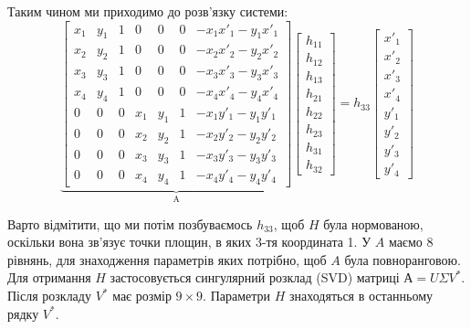 Таким чином ми приходимо до розв'язку системи:
\begin{equation}
    \underbrace{
        \begin{bmatrix}
            x_1 & y_1 & 1 & 0   & 0   & 0 & -x_1x'_1 -y_1x'_1 \\
            x_2 & y_2 & 1 & 0   & 0   & 0 & -x_2x'_2 -y_2x'_2 \\
            x_3 & y_3 & 1 & 0   & 0   & 0 & -x_3x'_3 -y_3x'_3 \\
            x_4 & y_4 & 1 & 0   & 0   & 0 & -x_4x'_4 -y_4x'_4 \\
            0   & 0   & 0 & x_1 & y_1 & 1 & -x_1y'_1 -y_1y'_1 \\
            0   & 0   & 0 & x_2 & y_2 & 1 & -x_2y'_2 -y_2y'_2 \\
            0   & 0   & 0 & x_3 & y_3 & 1 & -x_3y'_3 -y_3y'_3 \\
            0   & 0   & 0 & x_4 & y_4 & 1 & -x_4y'_4 -y_4y'_4
        \end{bmatrix}
    }_\textrm{A}
    \begin{bmatrix}
        h_{11} \\
        h_{12} \\
        h_{13} \\
        h_{21} \\
        h_{22} \\
        h_{23} \\
        h_{31} \\
        h_{32}
    \end{bmatrix}
    =
    h_{33}
    \begin{bmatrix}
        x'_1 \\
        x'_2 \\
        x'_3 \\
        x'_4 \\
        y'_1 \\
        y'_2 \\
        y'_3 \\
        y'_4
    \end{bmatrix}
\end{equation}

Варто відмітити, що ми потім  позбуваємось  $h_{33}$, щоб $H$ була нормованою, оскільки вона
зв'язує точки площин, в яких 3-тя координата 1.
У $A$ маємо 8 рівнянь, для знаходження параметрів яких потрібно, щоб $A$ була повноранговою.
Для отримання $H$ застосовується сингулярний розклад (SVD) матриці $А = U\Sigma V^*$.
Після розкладу $V^*$ має розмір $9\times9$. Параметри $H$ знаходяться в останньому рядку $V^*$.


